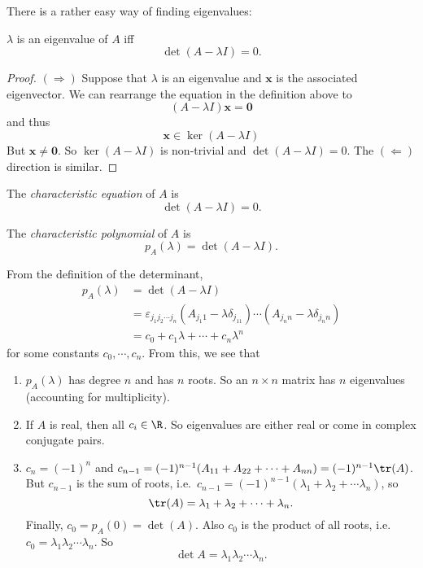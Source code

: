 \documentclass[a4paper]{article}
\begin{document}
There is a rather easy way of finding eigenvalues:
\begin{thm}
  $\lambda$ is an eigenvalue of $A$ iff
  \[
    \det(A - \lambda I) = 0.
  \]
\end{thm}

\begin{proof}
  $(\Rightarrow)$ Suppose that $\lambda$ is an eigenvalue and $\mathbf{x}$ is the associated eigenvector. We can rearrange the equation in the definition above to
  \[
    (A - \lambda I)\mathbf{x} = \mathbf{0}
  \]
  and thus
  \[
    \mathbf{x}\in \ker(A - \lambda I)
  \]
  But $\mathbf{x}\not= \mathbf{0}$. So $\ker(A - \lambda I)$ is non-trivial and $\det(A - \lambda I) = 0$. The $(\Leftarrow)$ direction is similar.
\end{proof}

\begin{defi}
  The \emph{characteristic equation} of $A$ is
  \[
    \det(A - \lambda I) = 0.
  \]
\end{defi}

\begin{defi}
  The \emph{characteristic polynomial} of $A$ is
  \[
    p_A(\lambda) = \det(A - \lambda I).
  \]
\end{defi}

From the definition of the determinant,
\begin{align*}
  p_A(\lambda) &= \det(A - \lambda I)\\
  &= \varepsilon_{j_1j_2\cdots j_n} (A_{j_1 1} - \lambda\delta_{j_11})\cdots (A_{j_n n} - \lambda\delta_{j_nn})\\
  &= c_0 + c_1\lambda + \cdots + c_n\lambda^n
\end{align*}
for some constants $c_0, \cdots, c_n$. From this, we see that
\begin{enumerate}
  \item $p_A(\lambda)$ has degree $n$ and has $n$ roots. So an $n\times n$ matrix has $n$ eigenvalues (accounting for multiplicity).
  \item If $A$ is real, then all $c_i\in \R$. So eigenvalues are either real or come in complex conjugate pairs.
  \item $c_n = (-1)^n$ and $c_{n - 1} = (-1)^{n - 1}(A_{11} + A_{22} + \cdots + A_{nn}) = (-1)^{n - 1}\tr(A)$. But $c_{n -1}$ is the sum of roots, i.e.\ $c_{n - 1}= (-1)^{n - 1}(\lambda_1 + \lambda_2 + \cdots \lambda_n)$, so
    \[
      \tr(A) = \lambda_1 + \lambda_2 + \cdots + \lambda_n.
    \]
    Finally, $c_0 = p_A(0) = \det(A)$. Also $c_0$ is the product of all roots, i.e.\ $c_0 = \lambda_1\lambda_2\cdots \lambda_n$. So
    \[
      \det A = \lambda_1\lambda_2\cdots \lambda_n.
    \]
\end{enumerate}
\end{document}
